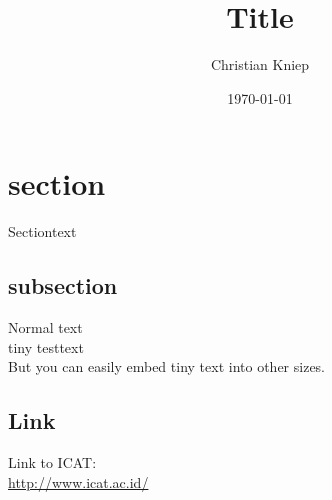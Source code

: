 \documentclass[11pt]{article}
\author{Christian Kniep}
\title{Title}
\date{\today}
\begin{document}
\maketitle
\section{section}
Sectiontext
\subsection{subsection}
Normal text \\ %
\tiny           %
tiny testtext \\
\normalsize     %
But you can easily embed {\tiny tiny text} into other sizes.
\subsection{Link}
Link to ICAT: \\
\url{http://www.icat.ac.id/}
\end{document}
